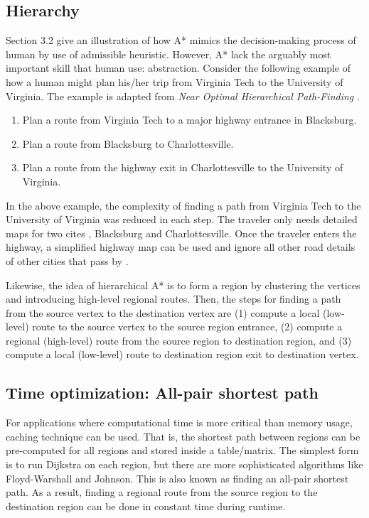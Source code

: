\documentclass{article}
\begin{document}
\subsection{Hierarchy}
Section 3.2 give an illustration of how A* mimics the decision-making process of human by use of admissible heuristic. However, A* lack the arguably most important skill that human use: abstraction. Consider the following example of how a human might plan his/her trip from Virginia Tech to the University of Virginia. The example is adapted from \textit{Near Optimal Hierarchical Path-Finding} \cite{Botea2004NearOH}.
\begin{enumerate}
    \item Plan a route from Virginia Tech to a major highway entrance in Blacksburg.
    \item Plan a route from Blacksburg to Charlottesville.
    \item Plan a route from the highway exit in Charlottesville to the University of Virginia.
\end{enumerate}
In the above example, the complexity of finding a path from Virginia Tech to the University of Virginia was reduced in each step. The traveler only needs detailed maps for two cites \cite{Botea2004NearOH}, Blacksburg and Charlottesville. Once the traveler enters the highway, a simplified highway map can be used and ignore all other road details of other cities that pass by \cite{Botea2004NearOH}.

Likewise, the idea of hierarchical A* is to form a region by clustering the vertices and introducing high-level regional routes. Then, the steps for finding a path from the source vertex to the destination vertex are (1) compute a local (low-level) route to the source vertex to the source region entrance, (2) compute a regional (high-level) route from the source region to destination region, and (3) compute a local (low-level) route to destination region exit to destination vertex.

\subsection{Time optimization: All-pair shortest path}
For applications where computational time is more critical than memory usage, caching technique can be used. That is, the shortest path between regions can be pre-computed for all regions and stored inside a table/matrix. The simplest form is to run Dijkstra on each region, but there are more sophisticated algorithms like Floyd-Warshall and Johnson. This is also known as finding an all-pair shortest path. As a result, finding a regional route from the source region to the destination region can be done in constant time during runtime. 
\end{document}
